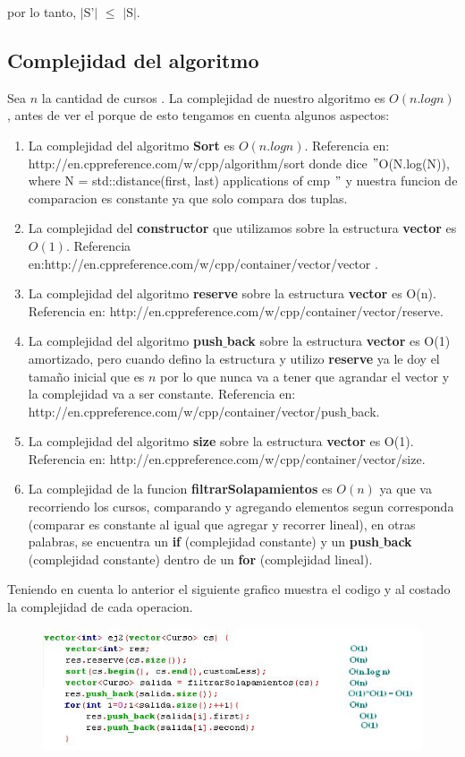 por lo tanto, $|$S'$|$ $\leq$ $|$S$|$. 


\subsection{Complejidad del algoritmo}

Sea $n$ la cantidad de cursos . La complejidad de nuestro algoritmo es $O(n.log n)$, antes de ver el porque de esto tengamos en cuenta algunos aspectos:
\begin{enumerate}
\item La complejidad del algoritmo \textbf{Sort} es $O(n.log n)$. Referencia en: http://en.cppreference.com/w/cpp/algorithm/sort donde dice $"$O(N.log(N)), where N = std::distance(first, last) applications of cmp $"$ y nuestra funcion de comparacion es constante ya que solo compara dos tuplas.
\item La complejidad del \textbf{constructor} que utilizamos sobre la estructura \textbf{vector} es $O(1)$. Referencia en:http://en.cppreference.com/w/cpp/container/vector/vector .
\item La complejidad del algoritmo \textbf{reserve} sobre la estructura \textbf{vector} es O(n). Referencia en: http://en.cppreference.com/w/cpp/container/vector/reserve. 
\item La complejidad del algoritmo \textbf{push$\_$back} sobre la estructura \textbf{vector} es O(1) amortizado, pero cuando defino la estructura y utilizo \textbf{reserve} ya le doy el tamaño inicial que es $n$ por lo que nunca va a tener que agrandar el vector y la complejidad va a ser constante. Referencia en: http://en.cppreference.com/w/cpp/container/vector/push$\_$back. 
\item La complejidad del algoritmo \textbf{size} sobre la estructura \textbf{vector} es O(1). Referencia en: http://en.cppreference.com/w/cpp/container/vector/size.
\item La complejidad de la funcion \textbf{filtrarSolapamientos} es $O(n)$ ya que va recorriendo los cursos, comparando y agregando elementos segun corresponda (comparar es constante al igual que agregar y recorrer lineal), en otras palabras, se encuentra un \textbf{if} (complejidad constante) y un \textbf{push$\_$back} (complejidad constante) dentro de un \textbf{for} (complejidad lineal). 
\end{enumerate}
Teniendo en cuenta lo anterior el siguiente grafico muestra el codigo y al costado la complejidad de cada operacion.

\begin{figure}[H] %
\begin{center}
\includegraphics[]{../imgs/comple2.jpg}
\end{center}
\end{figure}

